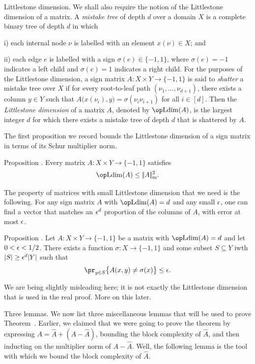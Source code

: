 \medskip\boldlabel Littlestone dimension.
We shall also require the notion of the Littlestone dimension of a matrix. A {\it mistake tree} of depth
$d$ over a domain $X$ is a complete binary tree of depth $d$ in which
\medskip
\item{i)} each internal node $\nu$ is labelled with an element $x(\nu)\in X$; and
\smallskip
\item{ii)} each edge $e$ is labelled with a sign $\sigma(e)\in \{-1,1\}$, where $\sigma(e) = -1$
indicates a left child and $\sigma(e) = 1$ indicates a right child.
\medskip
For the purposes of the Littlestone dimension, a sign matrix $A : X\times Y \to \{-1,1\}$ is
said to {\it shatter} a mistake tree over $X$ if for every root-to-leaf path
$(\nu_1,\ldots,\nu_{d+1})$, there exists a column $y\in Y$ such that
$A\bigl( x(\nu_i), y\bigr) = \sigma(\nu_i\nu_{i+1})$ for all $i\in [d]$. Then the {\it Littlestone
dimension} of a matrix $A$, denoted by $\Ldim(A)$, is the largest integer $d$ for which
there exists a mistake tree of depth $d$ that is shattered by $A$.

The first proposition we record
bounds the Littlestone dimension of a sign matrix in terms of its Schur multiplier norm.

\edef\propldimbound{\the\sectcount.\the\thmcount}
\proclaim Proposition \advthm. Every matrix $A : X\times Y \to \{-1,1\}$ satisfies
$$\Ldim(A) \le \normschur{A}^2.$$

The property of matrices with small Littlestone dimension that we need is the following.
For any sign matrix $A$ with $\Ldim(A) = d$ and any small $\epsilon$, one can find a
vector that matches an $\epsilon^d$ proportion of the columns of $A$, with error at most $\epsilon$.

\edef\propfixedvector{\the\sectcount.\the\thmcount}
\proclaim Proposition \advthm. Let $A : X\times Y \to \{-1,1\}$ be a matrix with $\Ldim(A) = d$
and let $0<\epsilon<1/2$. There exists a function $\sigma : X\to \{-1,1\}$ and some subset
$S\subseteq Y$ iwth $|S|\ge \epsilon^d |Y|$ such that
$$\pr_{y\in S} \bigl\{ A(x,y)\ne \sigma(x)\bigr\} \le \eps.$$

We are being slightly misleading here; it is not exactly the Littlestone dimension that is
used in the real proof. More on this later.

\medskip\boldlabel Three lemmas.
We now list three miscellaneous lemmas that will be used to prove Theorem~{\thmGH}.
Earlier, we claimed that we were going to prove the theorem by expressing $A = \hat A + (A-\hat A)$,
bounding the block complexity of $\hat A$, and then inducting on the multiplier norm of $A-\hat A$.
Well, the following lemma is the tool with which we bound the block complexity of $\hat A$.

